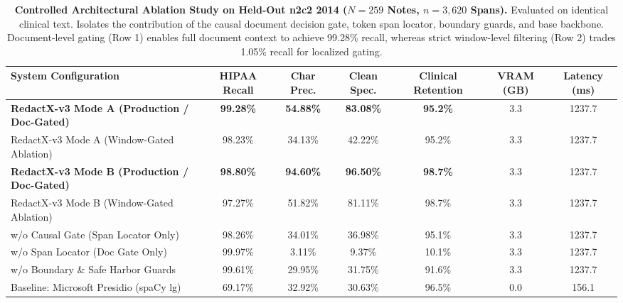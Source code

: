 \documentclass[11pt,a4paper]{article}
\begin{document}
\begin{table}[t]
\centering
\small
\caption{\textbf{Controlled Architectural Ablation Study on Held-Out n2c2 2014 ($N=259$ Notes, $n=3,620$ Spans).} Evaluated on identical clinical text. Isolates the contribution of the causal document decision gate, token span locator, boundary guards, and base backbone. Document-level gating (Row 1) enables full document context to achieve 99.28\% recall, whereas strict window-level filtering (Row 2) trades 1.05\% recall for localized gating.}
\label{tab:ablation_study}
\begin{tabular}{lcccccc}
\toprule
\textbf{System Configuration} & \textbf{HIPAA Recall} & \textbf{Char Prec.} & \textbf{Clean Spec.} & \textbf{Clinical Retention} & \textbf{VRAM (GB)} & \textbf{Latency (ms)} \\
\midrule
\textbf{RedactX-v3 Mode A (Production / Doc-Gated)} & \textbf{99.28\%} & \textbf{54.88\%} & \textbf{83.08\%} & \textbf{95.2\%} & 3.3 & 1237.7 \\
RedactX-v3 Mode A (Window-Gated Ablation) & 98.23\% & 34.13\% & 42.22\% & 95.2\% & 3.3 & 1237.7 \\
\textbf{RedactX-v3 Mode B (Production / Doc-Gated)} & \textbf{98.80\%} & \textbf{94.60\%} & \textbf{96.50\%} & \textbf{98.7\%} & 3.3 & 1237.7 \\
RedactX-v3 Mode B (Window-Gated Ablation) & 97.27\% & 51.82\% & 81.11\% & 98.7\% & 3.3 & 1237.7 \\
w/o Causal Gate (Span Locator Only) & 98.26\% & 34.01\% & 36.98\% & 95.1\% & 3.3 & 1237.7 \\
w/o Span Locator (Doc Gate Only) & 99.97\% & 3.11\% & 9.37\% & 10.1\% & 3.3 & 1237.7 \\
w/o Boundary \& Safe Harbor Guards & 99.61\% & 29.95\% & 31.75\% & 91.6\% & 3.3 & 1237.7 \\
Baseline: Microsoft Presidio (spaCy lg) & 69.17\% & 32.92\% & 30.63\% & 96.5\% & 0.0 & 156.1 \\
\bottomrule
\end{tabular}
\end{table}
\end{document}
